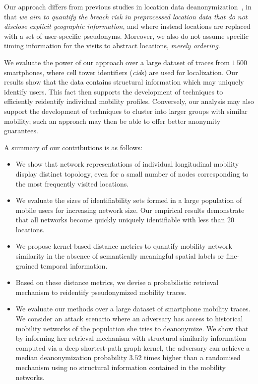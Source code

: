 Our approach differs from previous studies in location data deanonymization~\cite{Gambs2014, deMulder08, Naini2016a, Golle2009}, in that \emph{we aim to quantify the breach risk in preprocessed location data that do not disclose explicit geographic information}, and where instead locations are replaced with a set of user-specific pseudonyms.
Moreover, we also do not assume specific timing information for the visits to abstract locations, \emph{merely ordering}.

We evaluate the power of our approach over a large dataset of traces from $1\,500$ smartphones, where cell tower identifiers (\emph{cid}s) are used for localization.
Our results show that the data contains structural information which may uniquely identify users.
This fact then supports the development of techniques to efficiently reidentify individual mobility profiles.
Conversely, our analysis may also support the development of techniques to cluster into larger groups with similar mobility; such an approach may then be able to offer better anonymity guarantees.

A summary of our contributions is as follows:

\begin{itemize}

\item We show that network representations of individual longitudinal mobility display distinct topology, even for a small number of nodes corresponding to the most frequently visited locations.

\item We evaluate the sizes of identifiability sets formed in a large population of mobile users for increasing network size.
Our empirical results demonstrate that all networks become quickly uniquely identifiable with less than $20$ locations.

\item We propose kernel-based distance metrics to quantify mobility network similarity in the absence of semantically meaningful spatial labels or fine-grained temporal information.

\item Based on these distance metrics, we devise a probabilistic retrieval mechanism to reidentify pseudonymized mobility traces.

\item We evaluate our methods over a large dataset of smartphone mobility traces. We consider an attack scenario where an adversary has access to historical mobility networks of the population she tries to deanonymize. We show that by informing her retrieval mechanism with structural similarity information computed via a deep shortest-path graph kernel, the adversary can achieve a median deanonymization probability $3.52$ times higher than a randomised mechanism using no structural information contained in the mobility networks.

\end{itemize}
